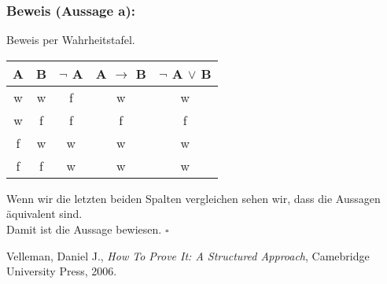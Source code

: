 \documentclass{article}
\begin{document}
\subsubsection*{Beweis (Aussage a):}
Beweis per Wahrheitstafel. \\
\begin{center}
    \begin{tabular}{|c|c|c|c|c|}
        \hline
        A & B & $\neg$ A & A $\rightarrow$ B & $\neg$ A $\vee$ B \\
        \hline
        \hline
        w & w & f & w & w \\
        w & f & f & f & f \\
        f & w & w & w & w \\
        f & f & w & w & w \\
        \hline
    \end{tabular}
\end{center}
Wenn wir die letzten beiden Spalten vergleichen sehen wir, dass die Aussagen äquivalent sind. \\
Damit ist die Aussage bewiesen. $\square$\\

\begin{thebibliography}{9}
    Velleman, Daniel J.,
    \emph{How To Prove It: A Structured Approach},
    Camebridge University Press, 2006.
    \end{thebibliography}
\end{document}
